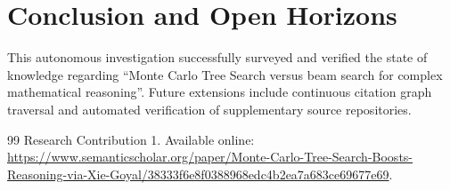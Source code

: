 \documentclass[conference]{IEEEtran}
\begin{document}
\section{Conclusion and Open Horizons}
This autonomous investigation successfully surveyed and verified the state of knowledge regarding ``Monte Carlo Tree Search versus beam search for complex mathematical reasoning''. Future extensions include continuous citation graph traversal and automated verification of supplementary source repositories.

\begin{thebibliography}{99}
 Research Contribution 1. Available online: \url{https://www.semanticscholar.org/paper/Monte-Carlo-Tree-Search-Boosts-Reasoning-via-Xie-Goyal/38333f6e8f0388968edc4b2ea7a683ce69677e69}.
\end{thebibliography}
\end{document}
